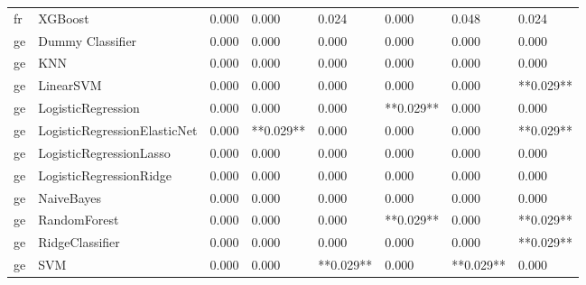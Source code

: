 \begin{tabular}{llllllll}
      fr &                      XGBoost & 0.000 &                     0.000 &                 0.024 &                  0.000 &                                   0.048 &     0.024 \\
      ge &             Dummy Classifier & 0.000 &                     0.000 &                 0.000 &                  0.000 &                                   0.000 &     0.000 \\
      ge &                          KNN & 0.000 &                     0.000 &                 0.000 &                  0.000 &                                   0.000 &     0.000 \\
      ge &                    LinearSVM & 0.000 &                     0.000 &                 0.000 &                  0.000 &                                   0.000 & **0.029** \\
      ge &           LogisticRegression & 0.000 &                     0.000 &                 0.000 &              **0.029** &                                   0.000 &     0.000 \\
      ge & LogisticRegressionElasticNet & 0.000 &                 **0.029** &                 0.000 &                  0.000 &                                   0.000 & **0.029** \\
      ge &      LogisticRegressionLasso & 0.000 &                     0.000 &                 0.000 &                  0.000 &                                   0.000 &     0.000 \\
      ge &      LogisticRegressionRidge & 0.000 &                     0.000 &                 0.000 &                  0.000 &                                   0.000 &     0.000 \\
      ge &                   NaiveBayes & 0.000 &                     0.000 &                 0.000 &                  0.000 &                                   0.000 &     0.000 \\
      ge &                 RandomForest & 0.000 &                     0.000 &                 0.000 &              **0.029** &                                   0.000 & **0.029** \\
      ge &              RidgeClassifier & 0.000 &                     0.000 &                 0.000 &                  0.000 &                                   0.000 & **0.029** \\
      ge &                          SVM & 0.000 &                     0.000 &             **0.029** &                  0.000 &                               **0.029** &     0.000 \\

\end{tabular}
